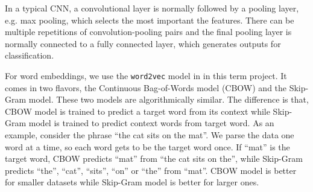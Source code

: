 In a typical CNN, a convolutional layer is normally followed by a pooling layer, e.g. max pooling, which selects the most important the features. There can be multiple repetitions of convolution-pooling pairs and the final pooling layer is normally connected to a fully connected layer, which generates outputs for classification. 

For word embeddings, we use the {\tt word2vec} model in \cite{mikolov2013} in this term project. It comes in two flavors, the Continuous Bag-of-Words model (CBOW) and the Skip-Gram model. These two models are algorithmically similar. The difference is that, CBOW model is trained to predict a target word from its context while Skip-Gram model is trained to predict context words from target word. As an example, consider the phrase ``the cat sits on the mat''. We parse the data one word at a time, so each word gets to be the target word once. If ``mat'' is the target word, CBOW predicts ``mat'' from ``the cat sits on the'', while Skip-Gram predicts ``the'', ``cat'', ``sits'', ``on'' or ``the'' from ``mat''. CBOW model is better for smaller datasets while Skip-Gram model is better for larger ones.

